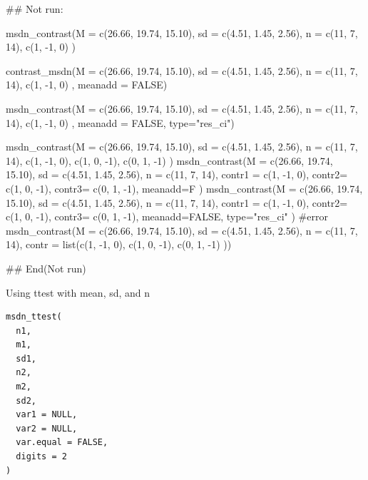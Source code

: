 \documentclass[a4paper]{book}
\begin{document}
\begin{Examples}
\begin{ExampleCode}
\#\# Not run: 


msdn_contrast(M = c(26.66, 19.74, 15.10),
              sd = c(4.51, 1.45, 2.56),
              n = c(11, 7, 14),
              c(1, -1, 0) )

contrast_msdn(M = c(26.66, 19.74, 15.10),
              sd = c(4.51, 1.45, 2.56),
              n = c(11, 7, 14),
              c(1, -1, 0) ,
              meanadd = FALSE)

msdn_contrast(M = c(26.66, 19.74, 15.10),
              sd = c(4.51, 1.45, 2.56),
              n = c(11, 7, 14),
              c(1, -1, 0) ,
             meanadd = FALSE,
              type="res_ci")


msdn_contrast(M = c(26.66, 19.74, 15.10),
              sd = c(4.51, 1.45, 2.56),
             n = c(11, 7, 14),
              c(1, -1,  0),
              c(1,  0, -1),
              c(0,  1, -1)
)
msdn_contrast(M = c(26.66, 19.74, 15.10),
              sd = c(4.51, 1.45, 2.56),
              n = c(11, 7, 14),
              contr1 = c(1, -1,  0),
              contr2= c(1,  0, -1),
              contr3= c(0,  1, -1),
              meanadd=F
)
msdn_contrast(M = c(26.66, 19.74, 15.10),
              sd = c(4.51, 1.45, 2.56),
              n = c(11, 7, 14),
             contr1 = c(1, -1,  0),
             contr2= c(1,  0, -1),
              contr3= c(0,  1, -1),
              meanadd=FALSE, type="res_ci"
)
#error
msdn_contrast(M = c(26.66, 19.74, 15.10),
              sd = c(4.51, 1.45, 2.56),
             n = c(11, 7, 14),
              contr = list(c(1, -1,  0),
                            c(1,  0, -1),
                           c(0,  1, -1)
              ))



## End(Not run)
\end{ExampleCode}
\end{Examples}
%
\begin{Description}
Using ttest with mean, sd, and n
\end{Description}
%
\begin{Usage}
\begin{verbatim}
msdn_ttest(
  n1,
  m1,
  sd1,
  n2,
  m2,
  sd2,
  var1 = NULL,
  var2 = NULL,
  var.equal = FALSE,
  digits = 2
)
\end{verbatim}
\end{Usage}
%
\end{document}
